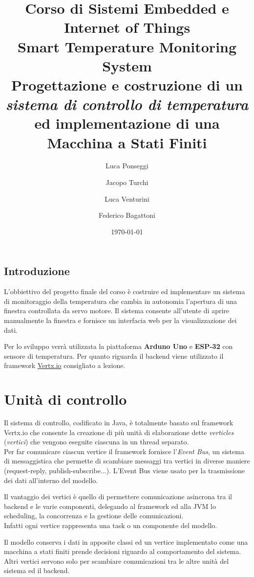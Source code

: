\documentclass{report}
\title{
\normalsize{Corso di Sistemi Embedded e Internet of Things}\\
\Huge{Smart Temperature Monitoring System}\\
\vspace{0.75em}
\large{Progettazione e costruzione di un \textit{sistema di controllo di temperatura} ed implementazione di una Macchina a Stati Finiti}
}
\author{Luca Ponseggi \and Jacopo Turchi \and Luca Venturini \and Federico Bagattoni}
\date{\today}
\begin{document}
\maketitle

\tableofcontents
\newpage
\section*{Introduzione}
\par{
L'obbiettivo del progetto finale del corso è costruire ed implementare un sistema di monitoraggio della temperatura che cambia in autonomia l'apertura di una finestra controllata da servo motore. Il sistema consente all'utente di aprire manualmente la finestra e fornisce un interfacia web per la visualizzazione dei dati.
}
\par{
Per lo sviluppo verrà utilizzata la piattaforma \textbf{Arduno Uno} e \textbf{ESP-32} con sensore di temperatura. Per quanto riguarda il backend viene utilizzato il framework \href{https://vertx.io/}{Vertx.io} consigliato a lezione.
}

\chapter{Unità di controllo}
\par {
Il sistema di controllo, codificato in Java, è totalmente basato sul framework Vertx.io che consente la creazione di più unità di elaborazione dette \textit{verticles} (\textit{vertici}) che vengono eseguite ciascuna in un thread separato. \\
Per far comunicare ciascun vertice il framework fornisce l'\textit{Event Bus}, un sistema di messaggistica che permette di scambiare messaggi tra vertici in diverse maniere (request-reply, publish-subscribe...). L'Event Bus viene usato per la trasmissione dei dati all'interno del modello. 
}
\par {
Il vantaggio dei vertici è quello di permettere comunicazione asincrona tra il backend e le varie componenti, delegando al framework ed alla JVM lo scheduling, la concorrenza e la gestione delle comunicazioni. \\
Infatti ogni vertice rappresenta una task o un componente del modello.
}
\par {
Il modello conserva i dati in apposite classi ed un vertice implementato come una macchina a stati finiti prende decisioni riguardo al comportamento del sistema. Altri vertici servono solo per scambiare comunicazioni tra le altre unità del sistema ed il backend.
}
\end{document}
